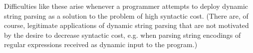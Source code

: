 \begin{enumerate}


\end{enumerate}

Difficulties like these arise whenever a programmer attempts to deploy dynamic string parsing as a solution to the problem of high syntactic cost. %
(There are, of course, legitimate applications of dynamic string parsing that are not motivated by the desire to decrease syntactic cost, e.g. when parsing string encodings of regular expressions received as dynamic input to the program.)%

